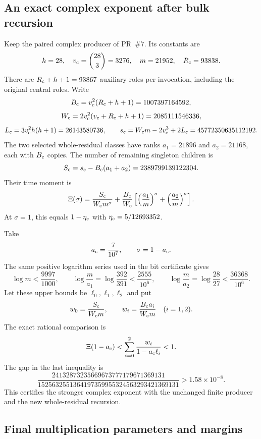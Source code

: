 \subsection{An exact complex exponent after bulk recursion}
\label{sec:batched-complex-parameters}

Keep the paired complex producer of PR~\#7. Its constants are
\[
 h=28,\quad v_{\rm c}=\binom{28}{3}=3276,\quad m=21952,
 \quad R_{\rm c}=93838.
\]
There are $R_{\rm c}+h+1=93867$ auxiliary roles per invocation, including
the original central roles. Write
\[
 B_{\rm c}=v_{\rm c}^2(R_{\rm c}+h+1)=1007397164592,
\]
\[
 W_{\rm c}=2v_{\rm c}^2(v_{\rm c}+R_{\rm c}+h+1)=2085111546336,
\]
\[
 L_{\rm c}=3v_{\rm c}^2h(h+1)=26143580736,
 \qquad
 s_{\rm c}=W_{\rm c}m-2v_{\rm c}^3+2L_{\rm c}=45772350635112192.
\]
The two selected whole-residual classes have ranks $a_1=21896$ and
$a_2=21168$, each with $B_{\rm c}$ copies. The number of remaining
singleton children is
\[
 S_{\rm c}=s_{\rm c}-B_{\rm c}(a_1+a_2)=2389799139122304.
\]
Their time moment is
\[
 \Xi(\sigma)=\frac{S_{\rm c}}{W_{\rm c}m^\sigma}
    +\frac{B_{\rm c}}{W_{\rm c}}
      \left[\left(\frac{a_1}{m}\right)^\sigma
           +\left(\frac{a_2}{m}\right)^\sigma\right].
\]
At $\sigma=1$, this equals
$1-\eta_{\rm c}$ with $\eta_{\rm c}=5/12693352$.

Take
\[
 a_{\rm c}=\frac7{10^7},\qquad \sigma=1-a_{\rm c}.
\]
The same positive logarithm series used in the bit certificate gives
\[
 \log m<\frac{9997}{1000},\qquad
 \log\frac m{a_1}=\log\frac{392}{391}<\frac{2555}{10^6},
 \qquad
 \log\frac m{a_2}=\log\frac{28}{27}<\frac{36368}{10^6}.
\]
Let these upper bounds be $\ell_0,\ell_1,\ell_2$ and put
\[
 w_0=\frac{S_{\rm c}}{W_{\rm c}m},\qquad
 w_i=\frac{B_{\rm c}a_i}{W_{\rm c}m}\quad(i=1,2).
\]
The exact rational comparison is
\[
 \Xi(1-a_{\rm c})
 <\sum_{i=0}^2\frac{w_i}{1-a_{\rm c}\ell_i}<1.
\]
The gap in the last inequality is
\[
 \frac{24132873235669673777179671369131}
      {1525632551364197359955324563293421369131}
 >1.58\times10^{-8}.
\]
This certifies the stronger complex exponent with the unchanged
finite producer and the new whole-residual recursion.

\subsection{Final multiplication parameters and margins}
\label{sec:batched-final-assembly}


